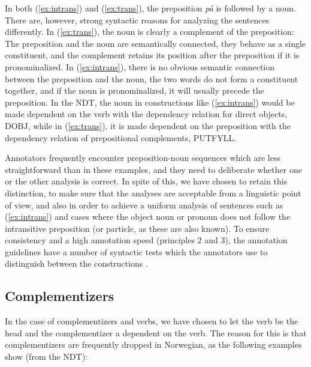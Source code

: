 \documentclass[10pt,a4paper]{article}
\begin{document}
In both (\ref{ex:intrans}) and (\ref{ex:trans}), the preposition \emph{på} is followed by a noun. There are, however, strong syntactic reasons for analyzing the sentences differently. In (\ref{ex:trans}), the noun is clearly a complement of the preposition: The preposition and the noun are semantically connected, they behave as a single constituent, and the complement retains its position after the preposition if it is pronominalized. In (\ref{ex:intrans}), there is no obvious semantic connection between the preposition and the noun, the two words do not form a constituent together, and if the noun is pronominalized, it will usually precede the preposition. In the NDT, the noun in constructions like (\ref{ex:intrans}) would be made dependent on the verb with the dependency relation for direct objects, DOBJ, while in (\ref{ex:trans}), it is made dependent on the preposition with the dependency relation of prepositional complements, PUTFYLL.

Annotators frequently encounter preposition-noun sequences which are less straightforward than in these examples, and they need to deliberate whether one or the other analysis is correct. In spite of this, we have chosen to retain this distinction, to make sure that the analyses are acceptable from a linguistic point of view, and also in order to achieve a uniform analysis of sentences such as (\ref{ex:intrans}) and cases where the object noun or pronoun does not follow the intransitive preposition (or particle, as these are also known). To ensure consistency and a high annotation speed (principles 2 and 3), the annotation guidelines have a number of syntactic tests which the annotators use to distinguish between the constructions \cite[54-56]{Kin:Sol:Eri:2013}.

\subsection{Complementizers}\label{comps}
In the case of complementizers and verbs, we have chosen to let the verb be the head and the complementizer a dependent on the verb. The reason for this is that
complementizers are frequently dropped in Norwegian, as the following examples show (from the NDT):
\end{document}
